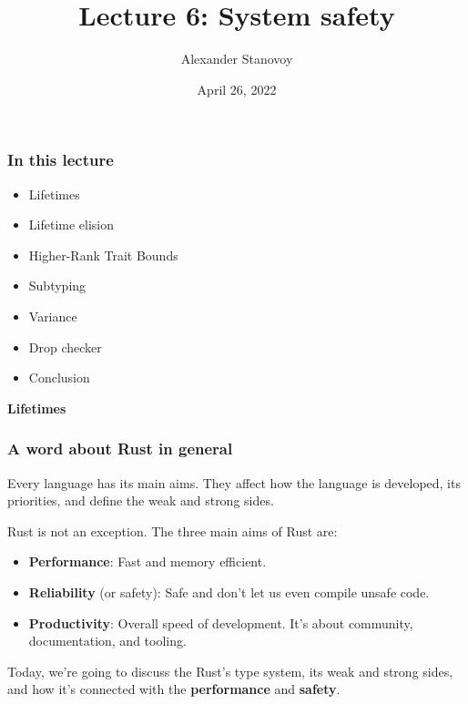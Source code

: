 \documentclass[aspectratio=1610,t]{beamer}
\title{Lecture 6: System safety}
\date{April 26, 2022}
\author{Alexander Stanovoy}
\institute{alex.stanovoy@gmail.com}
\begin{document}

\begin{frame}
\maketitle
\end{frame}


\begin{frame}[fragile]
\frametitle{In this lecture}
\begin{itemize}
    \item Lifetimes
    \item Lifetime elision
    \item Higher-Rank Trait Bounds
    \item Subtyping
    \item Variance
    \item Drop checker
    \item Conclusion
\end{itemize}
\end{frame}


\begin{frame}[c]
\centering\Huge\textbf{Lifetimes}
\end{frame}


\begin{frame}[fragile]
\frametitle{A word about Rust in general}
Every language has its main aims. They affect how the language is developed, its priorities, and define the weak and strong sides.

Rust is not an exception. The three main aims of Rust are:

\begin{itemize}
    \item \textbf{Performance}: Fast and memory efficient.
    \item \textbf{Reliability} (or safety): Safe and don't let us even compile unsafe code.
    \item \textbf{Productivity}: Overall speed of development. It's about community, documentation, and tooling.
\end{itemize}

Today, we're going to discuss the Rust's type system, its weak and strong sides, and how it's connected with the \textbf{performance} and \textbf{safety}.
\end{frame}
\end{document}
